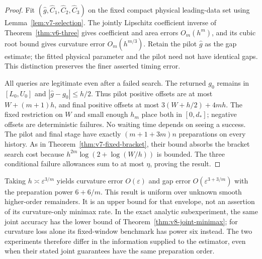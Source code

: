 \begin{proof}
Fit $(\widehat g,\widehat C_1,\widehat C_2,\widehat C_3)$ on the
fixed compact physical leading-data set using
Lemma~\ref{lem:v7-selection}. The jointly Lipschitz coefficient inverse
of Theorem~\ref{thm:v6-three} gives coefficient and area errors
$O_m(h^m)$, and its cubic root bound gives curvature error $O_m(h^{m/3})$.
Retain the pilot $\widehat g$ as the gap estimate; the fitted physical
parameter and the pilot need not have identical gaps. This distinction
preserves the finer asserted timing error.

All queries are legitimate even after a failed search. The returned
$g_0$ remains in $[L_0,U_0]$ and
$|\widehat g-g_0|\le h/2$. Thus pilot positive offsets are at most
$W+(m+1)h$, and final positive offsets at most
$3(W+h/2)+4mh$. The fixed restriction on $W$ and small enough $h_m$
place both in $[0,d_*]$; negative offsets are deterministic failures.
No waiting time depends on seeing a success. The pilot and final stage
have exactly $(m+1+3m)n$ preparations on every history. As in
Theorem~\ref{thm:v7-fixed-bracket}, their bound absorbs the bracket
search cost because $h^{2m}\log(2+\log(W/h))$ is bounded. The three
conditional failure allowances sum to at most $\eta$, proving the
result.
\end{proof}

Taking $h\asymp\varepsilon^{3/m}$ yields curvature error
$O(\varepsilon)$ and gap error $O(\varepsilon^{3+3/m})$ with the
preparation power $6+6/m$. This result is uniform over unknown smooth
higher-order remainders. It is an upper bound for that envelope, not an
assertion of its curvature-only minimax rate. In the exact analytic
subexperiment, the same joint accuracy has the lower bound of
Theorem~\ref{thm:v8-joint-minimax}; for curvature loss alone its
fixed-window benchmark has power six instead. The two experiments
therefore differ in the information supplied to the estimator, even
when their stated joint guarantees have the same preparation order.

